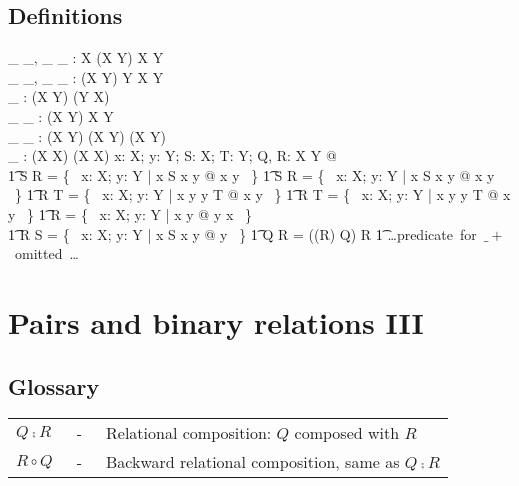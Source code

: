 \subsection*{Definitions}

\begin{gendef}[X,Y]
	\_ \dres \_, \_ \ndres \_ : \power X \cross (X \rel Y) \fun X \rel Y \\
	\_ \rres \_, \_ \nrres \_ : (X \rel Y)  \cross  \power Y \fun X \rel Y \\
	\_ \inv : (X \rel Y) \fun (Y \rel X) \\
	\_ \limg \_ \rimg : (X \rel Y) \cross \power X \fun \power Y \\
	\_ \oplus \_ : (X \rel Y) \cross (X \rel Y) \fun (X \rel Y) \\
	\_ \plus : (X \rel X) \fun (X \rel X)
\where
	\forall x: X; y: Y; S: \power X; T: \power Y; Q, R: X \rel Y @ \\
\also
\t1 S \dres R = \{~ x: X; y: Y | x \in S \land x  y @ x \mapsto y ~\} \land	
\also
\t1 S \ndres R = \{~ x: X; y: Y | x \notin S \land x  y @ x \mapsto y ~\} \land	
\also
\t1 R \rres T = \{~ x: X; y: Y | x  y \land y \in T @ x \mapsto y ~\} \land	
\also
\t1 R \nrres T = \{~ x: X; y: Y | x  y \land y \notin T @ x \mapsto y ~\} \land	
\also	
\t1	R \inv = \{~ x: X; y: Y | x  y @ y \mapsto x ~\} \land \\
\also 
\t1 R \limg S \rimg = \{~ x: X; y: Y | x \in S \land x  y @ y ~\} \land	
\also
\t1	Q \oplus R = ((\dom R) \ndres Q) \cup R
\also
\t1	\mbox{\dots predicate for $\_ \plus$ omitted \dots}
\also
\end{gendef}


\newpage

\section*{Pairs and binary relations III}

\subsection*{Glossary}

\begin{tabular}{l c l}
$Q \comp R$ & ~-~ & Relational composition: $Q$ composed with $R$ \\
$R \circ Q$ & ~-~ & Backward relational composition, same as $Q \comp R$ \\
\end{tabular}

